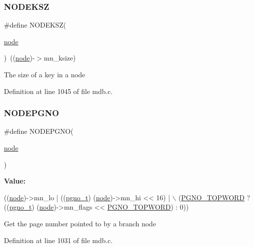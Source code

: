 \subsubsection{\texorpdfstring{N\+O\+D\+E\+K\+SZ}{NODEKSZ}}
{\footnotesize\ttfamily \#define N\+O\+D\+E\+K\+SZ(\begin{DoxyParamCaption}\item[{}]{\mbox{\hyperlink{structnode}{node}} }\end{DoxyParamCaption})~((\mbox{\hyperlink{structnode}{node}})-\/$>$mn\+\_\+ksize)}

The size of a key in a node 

Definition at line 1045 of file mdb.\+c.

\mbox{\label{group__internal_gabc71d778f3391485aee252505fb06e90}} 
\subsubsection{\texorpdfstring{N\+O\+D\+E\+P\+G\+NO}{NODEPGNO}}
{\footnotesize\ttfamily \#define N\+O\+D\+E\+P\+G\+NO(\begin{DoxyParamCaption}\item[{}]{\mbox{\hyperlink{structnode}{node}} }\end{DoxyParamCaption})}

{\bfseries Value\+:}
\begin{DoxyCode}
((\mbox{\hyperlink{structnode}{node}})->mn\_lo | ((\mbox{\hyperlink{group__internal_gadb65f0424c9d3827bf6409087ad555cd}{pgno\_t}}) (\mbox{\hyperlink{structnode}{node}})->mn\_hi << 16) | \(\backslash\)
     (\mbox{\hyperlink{group__internal_gac226a942178d95066131a42e50c29d79}{PGNO\_TOPWORD}} ? ((\mbox{\hyperlink{group__internal_gadb65f0424c9d3827bf6409087ad555cd}{pgno\_t}}) (\mbox{\hyperlink{structnode}{node}})->mn\_flags << 
      \mbox{\hyperlink{group__internal_gac226a942178d95066131a42e50c29d79}{PGNO\_TOPWORD}}) : 0))
\end{DoxyCode}
Get the page number pointed to by a branch node 

Definition at line 1031 of file mdb.\+c.

\mbox{\label{group__internal_gadd8222b06a62d77398a5d719e973a66d}} 
